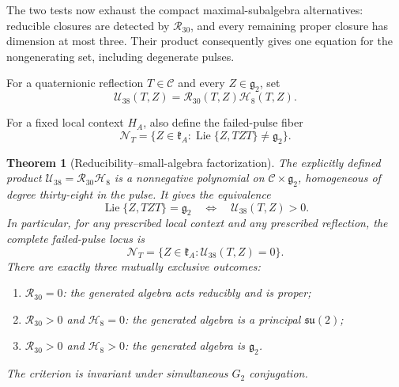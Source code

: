 \documentclass[11pt,a4paper]{article}
\newtheorem{theorem}{Theorem}[section]
\newcommand{\Lie}{\operatorname{Lie}}
\begin{document}
The two tests now exhaust the compact maximal-subalgebra alternatives:
reducible closures are detected by $\mathcal R_{30}$, and every remaining
proper closure has dimension at most three.  Their product consequently gives
one equation for the nongenerating set, including degenerate pulses.

For a quaternionic reflection $T\in\mathscr C$ and every $Z\in\mathfrak g_2$, set
\begin{equation}
\mathcal U_{38}(T,Z)=\mathcal R_{30}(T,Z)\mathcal H_8(T,Z).
\label{eq:U38}
\end{equation}

For a fixed local context $H_A$, also define the failed-pulse fiber
\[
\mathcal N_T=\{Z\in\mathfrak k_A:\Lie\{Z,TZT\}\ne\mathfrak g_2\}.
\]

\begin{theorem}[Reducibility--small-algebra factorization]
\label{thm:universal-locus}
The explicitly defined product $\mathcal U_{38}=\mathcal R_{30}\mathcal H_8$ is a nonnegative polynomial on $\mathscr C\times\mathfrak g_2$, homogeneous of degree thirty-eight in the pulse.  It gives the equivalence
\begin{equation}
\Lie\{Z,TZT\}=\mathfrak g_2
\quad\Longleftrightarrow\quad
\mathcal U_{38}(T,Z)>0.
\label{eq:universal-exact}
\end{equation}
In particular, for any prescribed local context and any prescribed reflection, the complete failed-pulse locus is
\begin{equation}
\mathcal N_T=\{Z\in\mathfrak k_A:\mathcal U_{38}(T,Z)=0\}.
\label{eq:NT-exact}
\end{equation}
There are exactly three mutually exclusive outcomes:
\begin{enumerate}[label=\textnormal{(\roman*)},leftmargin=8mm]
\item $\mathcal R_{30}=0$: the generated algebra acts reducibly and is proper;
\item $\mathcal R_{30}>0$ and $\mathcal H_8=0$: the generated algebra is a principal $\mathfrak{su}(2)$;
\item $\mathcal R_{30}>0$ and $\mathcal H_8>0$: the generated algebra is $\mathfrak g_2$.
\end{enumerate}
The criterion is invariant under simultaneous $G_2$ conjugation.
\end{theorem}
\end{document}
